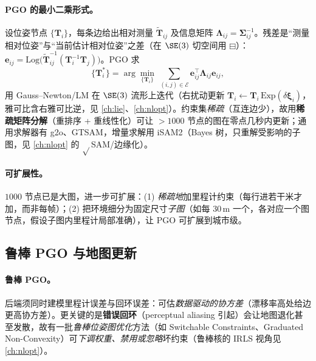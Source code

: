\paragraph{PGO 的最小二乘形式。}
设位姿节点 $\{\mathbf{T}_i\}$，每条边给出相对测量 $\tilde{\mathbf{T}}_{ij}$ 及信息矩阵 $\boldsymbol{\Lambda}_{ij}=\boldsymbol{\Sigma}_{ij}^{-1}$。残差是“测量相对位姿”与“当前估计相对位姿”之差（在 $\SE(3)$ 切空间用 $\boxminus$）：$\mathbf{e}_{ij}=\mathrm{Log}\big(\tilde{\mathbf{T}}_{ij}^{-1}(\mathbf{T}_i^{-1}\mathbf{T}_j)\big)$。PGO 求
\begin{equation}
  \{\mathbf{T}_i^*\}=\arg\min_{\{\mathbf{T}_i\}}\ \sum_{(i,j)\in\mathcal{E}}\mathbf{e}_{ij}^\top\boldsymbol{\Lambda}_{ij}\mathbf{e}_{ij},
  \label{eq:lidar-pgo}
\end{equation}
用 Gauss–Newton/LM 在 $\SE(3)$ 流形上迭代（右扰动更新 $\mathbf{T}_i\leftarrow\mathbf{T}_i\,\mathrm{Exp}(\delta\boldsymbol{\xi}_i)$，雅可比含右雅可比逆，见 \cref{ch:lie}、\cref{ch:nlopt}）。约束集\emph{稀疏}（互连边少），故用\textbf{稀疏矩阵分解}（重排序 + 重线性化）可让 $>1000$ 节点的图在零点几秒内更新\cite{carlone2026handbook}；通用求解器有 g2o、GTSAM\cite{dellaert2017factor}，增量求解用 iSAM2\cite{kaess2012isam2}（Bayes 树，只重解受影响的子图，见 \cref{ch:nlopt} 的 $\sqrt{}$SAM/边缘化）。

\paragraph{可扩展性。}
$1000$ 节点已是大图，进一步可扩展\cite{carlone2026handbook}：(1) \emph{稀疏地}加里程计约束（每行进若干米才加，而非每帧）；(2) 把环境细分为固定尺寸\emph{子图}（如每 $30$\,m 一个，各对应一个图节点，假设子图内里程计局部准确），让 PGO 可扩展到城市级。

\subsection{鲁棒 PGO 与地图更新}
\label{sec:lidar-robust-pgo}

\paragraph{鲁棒 PGO。}
后端须同时建模里程计误差与回环误差\cite{carlone2026handbook}：可估\emph{数据驱动的协方差}（漂移率高处给边更高协方差）。更关键的是\textbf{错误回环}（perceptual aliasing 引起）会让地图退化甚至发散，故有一批\emph{鲁棒位姿图优化}方法（如 Switchable Constraints\cite{sunderhauf2012switchable}、Graduated Non-Convexity\cite{yang2020gnc}）可\emph{下调权重、禁用或忽略}坏约束（鲁棒核的 IRLS 视角见 \cref{ch:nlopt}）。

